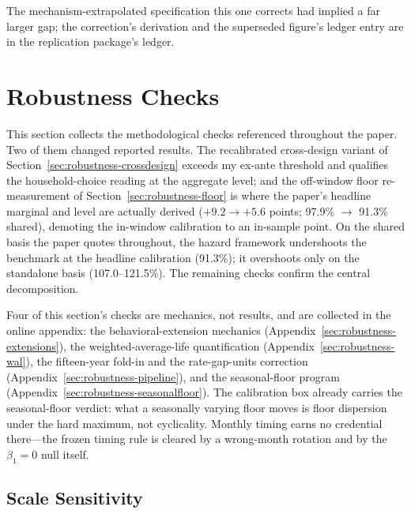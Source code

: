 \documentclass[12pt]{article}
\begin{document}
The mechanism-extrapolated specification this one corrects had implied a far larger gap; the correction's derivation and the superseded figure's ledger entry are in the replication package's ledger.

\section{Robustness Checks}\label{sec:robustness}

This section collects the methodological checks referenced throughout the paper. Two of them changed reported results. The recalibrated cross-design variant of Section~\ref{sec:robustness-crossdesign} exceeds my ex-ante threshold and qualifies the household-choice reading at the aggregate level; and the off-window floor re-measurement of Section~\ref{sec:robustness-floor} is where the paper's headline marginal and level are actually derived ($+9.2 \to +5.6$ points; 97.9\% $\to$ 91.3\% shared), demoting the in-window calibration to an in-sample point. On the shared basis the paper quotes throughout, the hazard framework undershoots the benchmark at the headline calibration (91.3\%); it overshoots only on the standalone basis (107.0--121.5\%). The remaining checks confirm the central decomposition.

Four of this section's checks are mechanics, not results, and are collected in the online appendix: the behavioral-extension mechanics (Appendix~\ref{sec:robustness-extensions}), the weighted-average-life quantification (Appendix~\ref{sec:robustness-wal}), the fifteen-year fold-in and the rate-gap-units correction (Appendix~\ref{sec:robustness-pipeline}), and the seasonal-floor program (Appendix~\ref{sec:robustness-seasonalfloor}). The calibration box already carries the seasonal-floor verdict: what a seasonally varying floor moves is floor dispersion under the hard maximum, not cyclicality. Monthly timing earns no credential there---the frozen timing rule is cleared by a wrong-month rotation and by the $\beta_1 = 0$ null itself.

\subsection{Scale Sensitivity}\label{sec:robustness-scale}
\end{document}
